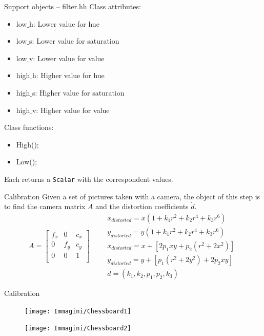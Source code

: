 \begin{frame}[fragile]{Support objects – filter.hh}
Class attributes:
\begin{itemize}
	\item low$\_$h: Lower value for hue	
	\item low$\_$s: Lower value for saturation
	\item low$\_$v: Lower value for value
	\item high$\_$h: Higher value for hue
	\item high$\_$s: Higher value for saturation
	\item high$\_$v: Higher value for value
\end{itemize}
Class functions:
\begin{itemize}
	\item High();
	\item Low();
\end{itemize}
Each returns a \texttt{Scalar} with the correspondent values.
\end{frame}

\begin{frame}{Calibration}
	Given a set of pictures taken with a camera, the object of this step is to find the camera matrix $A$ and the distortion coefficients $\dot{d}$.\newline
	\vfill
	\[
		A=\begin{bmatrix}
			f_x&0&c_x\\
			0&f_y&c_y\\
			0&0&1\\
		\end{bmatrix}\qquad
		\begin{matrix}
			x_{distorted}=x\left(1+k_1r^2+k_2r^4+k_3r^6\right)\\
			y_{distorted}=y\left(1+k_1r^2+k_2r^4+k_3r^6\right)\\
			x_{distorted}=x+\left[2p_1xy+p_2\left(r^2+2x^2\right)\right]\\
			y_{distorted}=y+\left[p_1\left(r^2+2y^2\right)+2p_2xy\right]\\
			\dot{d}=(k_1, k_2, p_1, p_2, k_3)
		\end{matrix}
	\]
	\vfill
\end{frame}


\begin{frame}{Calibration}
	\begin{figure}[H]
		\begin{minipage}{0.48\linewidth}
			\texttt{[image: Immagini/Chessboard1]}
		\end{minipage}
		\vspace{0.04\linewidth}
		\begin{minipage}{0.48\linewidth}
			\texttt{[image: Immagini/Chessboard2]}
		\end{minipage}
	\end{figure}
\end{frame}


